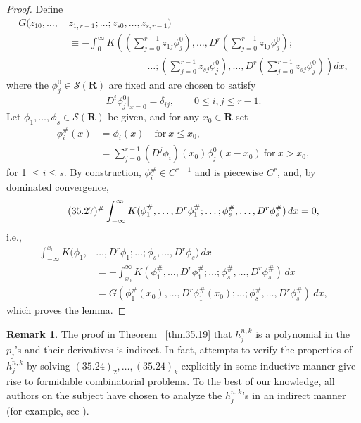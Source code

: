 \documentclass{surv-l}
\theoremstyle{plain}
\theoremstyle{definition}
\newtheorem{remark}[theorem]{Remark}
\numberwithin{equation}{chapter}
\begin{document}
\begin{proof}
Define
\begin{align*}
G(z_{10},\ldots,\,&z_{1,r-1};\ldots;z_{s0},\ldots,z_{s,r-1})\\
&\equiv-\int_{0}^{\infty}K\left(\left(\sum_{j=0}^{r-1}z_{1j}\phi_{j}^{0}\right)\right.,\ldots,D^{r}\left(\sum_{j=0}^{r-1}z_{1j}\phi_{j}^{0}\right);\\
&\qquad\qquad\qquad\qquad\ldots;\left.\left(\sum_{j=0}^{r-1}z_{sj}\phi_{j}^{0}\right),\ldots,D^{r}\left(\sum_{j=0}^{r-1}z_{sj}\phi_{j}^{0}\right)\right)dx,
\end{align*}
where the $\phi_{j}^{0}\in \mathscr{S}(\mathbf{R})$ are fixed and are chosen to satisfy
\begin{equation*}
D^{i}\phi_{j}^{0}|_{x=0}=\delta_{ij},\qquad 0\leq i,j\leq r-1.
\end{equation*}
Let $\phi_{1},\ldots,\phi_{s}\in \mathscr{S}(\mathbf{R})$ be given, and for any $x_{0}\in \mathbf{R}$ set
\begin{align*}
\phi_{i}^{\#}(x)&=\phi_{i}(x)\quad \mathrm{for}\ x\leq x_{0},\\
&=\displaystyle \sum_{j=0}^{r-1}(D^{j}\phi_{i})(x_{0})\phi_{j}^{0}(x-x_{0})\ \mathrm{for}\ x>x_{0},
\end{align*}
for 1 $\leq i\leq s$. By construction, $\phi_{i}^{\#}\in C^{r-1}$ and is piecewise $C^{r}$, and, by dominated convergence,
\begin{equation*}
\tag*{$(35.27)^{\#}$}  \int_{-\infty}^{\infty}K(\phi_{1}^{\#},\ldots,D^{r}\phi_{1}^{\#};\ldots;\phi_{s}^{\#}, \ldots,D^{r}\phi_{s}^{\#})\,dx=0,
\end{equation*}
i.e.,
\begin{align*}
\int_{-\infty}^{x_{0}}K(\phi_{1},&\ldots,D^{r}\phi_{1};\ldots;\phi_{s},\ldots,D^{r}\phi_{s})\,dx\\
&=-\int_{x_{0}}^{\infty}K(\phi_{1}^{\#},\ldots,D^{r}\phi_{1}^{\#};\ldots;\phi_{s}^{\#},\ldots, D^{r}\phi_{s}^{\#})\,dx\\
&=G(\phi_{1}^{\#}(x_{0}),\ldots,D^{r}\phi_{1}^{\#}(x_{0});\ldots;\phi_{s}^{\#}, \ldots,D^{r}\phi_{s}^{\#})\ dx,
\end{align*}
which proves the lemma.\quad
\end{proof}
\setcounter{theorem}{28}
\begin{remark}\label{rem35.29}
The proof in Theorem ~\ref{thm35.19} that $h_{j}^{n,k}$ is a polynomial in the $p_{j}$'s and their derivatives is indirect. In fact, attempts to verify the properties of $h_{j}^{n,k}$ by solving $(35.24)_{2},\ldots,(35.24)_{k}$ explicitly in some inductive manner give rise to formidable combinatorial problems. To the best of our knowledge, all authors on the subject have chosen to analyze the $h_{j}^{n,k}$'s in an indirect manner (for example, see \cite{GD, KW}).
\end{remark}
\end{document}
